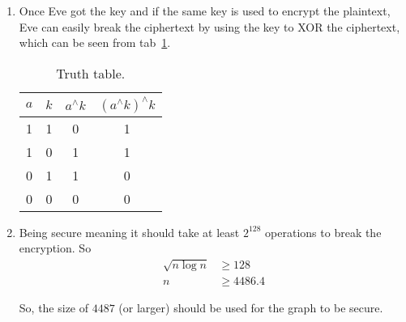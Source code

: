 \documentclass[11pt,a4paper]{article}
\begin{document}
\begin{enumerate}
	\item Once Eve got the key and if the same key is used to encrypt the plaintext, Eve can easily break the ciphertext by using the key to XOR the ciphertext, which can be seen from tab~\ref{tab:XOR}.
	\begin{table}[!ht]
		\caption{Truth table.}
		\label{tab:XOR}
		\centering
		\begin{tabular}{|c|c|c|c|}
			\hline 
			$a$ & $k$ & $a^{\wedge}k$ & $(a^{\wedge}k)^{\wedge}k$ \\ 
			\hline 
			1 & 1 & 0 & 1 \\ 
			\hline 
			1 & 0 & 1 & 1 \\ 
			\hline 
			0 & 1 & 1 & 0 \\ 
			\hline 
			0 & 0 & 0 & 0 \\ 
			\hline 
		\end{tabular}
	\end{table}
	
	\item Being secure meaning it should take at least $2^{128}$ operations to break the encryption. So
	\begin{align*}
		\sqrt{n\log n} &\geq 128 \\
		n &\geq 4486.4
	\end{align*}
	\par So, the size of $4487$ (or larger) should be used for the graph to be secure.
\end{enumerate}
\end{document}
